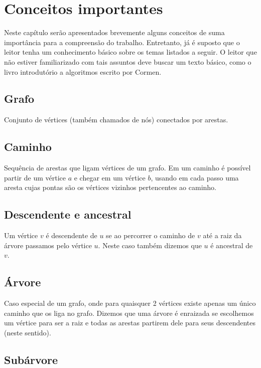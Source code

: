 \chapter{Conceitos importantes}
\label{cap:conceitos-importantes}

Neste capítulo serão apresentados brevemente alguns conceitos de suma importância 
para a compreensão do trabalho. Entretanto, já é suposto que o leitor tenha um 
conhecimento básico sobre os temas listados a seguir. O leitor que não estiver familiarizado com tais assuntos deve buscar um texto básico, como o livro introdutório a algoritmos escrito por Cormen\cite{cormen}.

\section{Grafo}

Conjunto de vértices (também chamados de nós) conectados por arestas.

\section{Caminho}

Sequência de arestas que ligam vértices de um grafo. Em um caminho é possível 
partir de um vértice $a$ e chegar em um vértice $b$, usando em cada passo uma aresta cujas pontas são os vértices vizinhos pertencentes ao caminho.

\section{Descendente e ancestral}

Um vértice $v$ é descendente de $u$ se ao percorrer o caminho de $v$ até a raiz da árvore passamos pelo vértice $u$. Neste caso também dizemos que $u$ é ancestral de $v$.

\section{Árvore}

Caso especial de um grafo, onde para quaisquer 2 vértices existe apenas um único caminho que os liga no grafo. Dizemos que uma árvore é enraizada se escolhemos um vértice para ser a raiz e todas as arestas partirem dele para seus descendentes (neste sentido).

\section{Subárvore}

